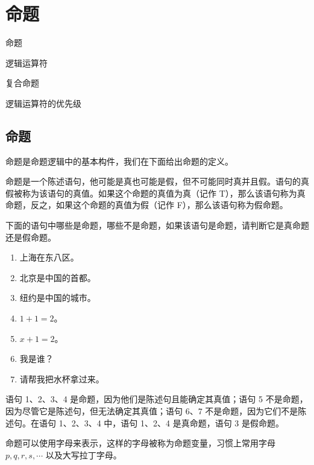 \section{命题}
\begin{introduction}
    \item 命题
    \item 逻辑运算符
    \item 复合命题
    \item 逻辑运算符的优先级
\end{introduction}

\subsection{命题}
命题是命题逻辑中的基本构件，我们在下面给出命题的定义。
\begin{definition}[命题的定义]\label{def:命题的定义}
    命题是一个陈述语句，他可能是真也可能是假，但不可能同时真并且假。语句的真假被称为该语句的真值。如果这个命题的真值为真（记作 T），那么该语句称为真命题，反之，如果这个命题的真值为假（记作 F），那么该语句称为假命题。
\end{definition}

\begin{collections}
    \begin{example}
        下面的语句中哪些是命题，哪些不是命题，如果该语句是命题，请判断它是真命题还是假命题。
        \begin{enumerate}
            \item 上海在东八区。
            \item 北京是中国的首都。
            \item 纽约是中国的城市。
            \item $1 + 1 = 2$。
            \item $x + 1 = 2$。
            \item 我是谁？
            \item 请帮我把水杯拿过来。
        \end{enumerate}
    \end{example}
    \begin{solution}
        语句 1、2、3、4 是命题，因为他们是陈述句且能确定其真值；语句 5 不是命题，因为尽管它是陈述句，但无法确定其真值；语句 6、7 不是命题，因为它们不是陈述句。在语句 1、2、3、4 中，语句 1、2、4 是真命题，语句 3 是假命题。
    \end{solution}
\end{collections}

命题可以使用字母来表示，这样的字母被称为命题变量，习惯上常用字母 $p, q, r, s, \cdots$ 以及大写拉丁字母。

